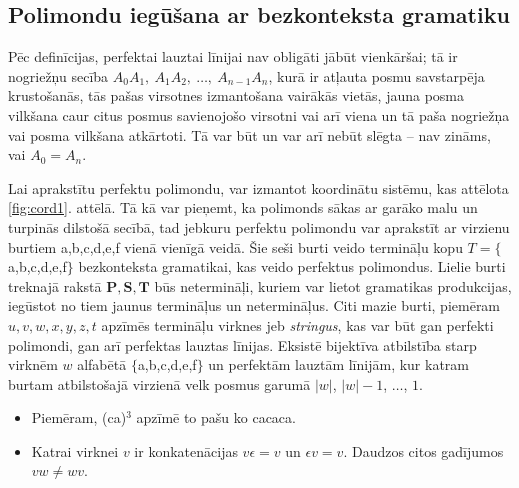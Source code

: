 \documentclass[utf8]{ludis2022}
\begin{document}
\subsection{Polimondu iegūšana ar bezkonteksta gramatiku}




\firstparskip Pēc definīcijas, perfektai lauztai līnijai nav obligāti jābūt vienkāršai; tā 
ir nogriežņu secība 
$A_0A_1,\ A_1A_2,\ \ldots,\ A_{n-1}A_n$, 
kurā ir atļauta posmu savstarpēja krustošanās, 
tās pašas virsotnes izmantošana vairākās vietās, 
jauna posma vilkšana caur citus posmus savienojošo 
virsotni vai arī viena un tā paša nogriežņa vai 
posma vilkšana atkārtoti. Tā var būt 
un var arī nebūt slēgta -- nav 
zināms, vai $A_0 = A_n$.  

\firstparskip Lai aprakstītu perfektu polimondu, var izmantot koordinātu sistēmu, kas attēlota \ref{fig:cord1}. attēlā. Tā kā var pieņemt, ka polimonds sākas ar garāko malu un turpinās dilstošā secībā, tad jebkuru perfektu polimondu var aprakstīt ar virzienu burtiem a,b,c,d,e,f vienā vienīgā veidā. Šie seši burti veido termināļu kopu $T= \{$a,b,c,d,e,f$\}$ bezkonteksta gramatikai, kas veido perfektus polimondus. Lielie burti treknajā rakstā $\mathbf{P}, \mathbf{S}, \mathbf{T}$
būs netermināļi, kuriem var lietot gramatikas produkcijas, 
iegūstot no tiem jaunus termināļus un netermināļus.
Citi mazie burti, piemēram $u,v,w,x,y,z,t$ apzīmēs 
termināļu virknes jeb {\em stringus}, kas var būt gan 
perfekti polimondi, gan arī perfektas lauztas līnijas. Eksistē bijektīva atbilstība starp virknēm 
$w$ alfabētā $\{$a,b,c,d,e,f$\}$ un perfektām lauztām 
līnijām, kur katram burtam atbilstošajā virzienā 
velk posmus garumā $|w|$, $|w|-1$, $\ldots$, $1$. 
\begin{itemize}
\item Piemēram, (ca)$^3$ apzīmē to pašu ko cacaca.
\item Katrai virknei $v$ ir konkatenācijas 
$v\epsilon = v$ un $\epsilon{}v = v$. Daudzos citos 
gadījumos $vw \neq wv$.
\end{itemize}
\end{document}
